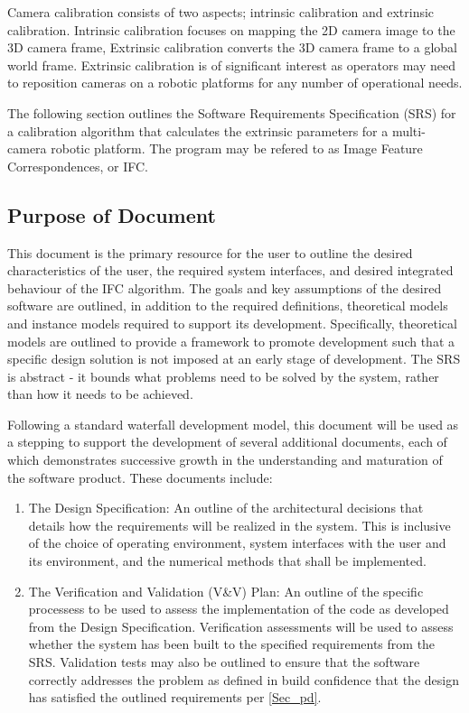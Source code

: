 \documentclass[12pt]{article}
\begin{document}
Camera calibration consists of two aspects; intrinsic calibration and extrinsic 
calibration. Intrinsic calibration focuses on mapping the 2D camera image 
to the 3D camera frame, Extrinsic calibration converts the 3D camera frame
to a global world frame. Extrinsic calibration is of significant interest as  
operators may need to reposition cameras on a robotic platforms for any number of 
operational needs.

The following section outlines the Software Requirements Specification (SRS) for 
a calibration algorithm that calculates the extrinsic parameters for a multi-camera 
robotic platform. The program may be refered to as Image Feature Correspondences, 
or IFC.



\subsection{Purpose of Document}

This document is the primary resource for the user to outline the desired 
characteristics of the user, the required system interfaces, and desired 
integrated behaviour of the IFC algorithm. The goals and key assumptions of the
desired software are outlined, in addition to the required definitions, 
theoretical models and instance models required to support its development. 
Specifically, theoretical models are outlined to provide a framework to promote 
development such that a specific design solution is not imposed at an early stage 
of development. The SRS is abstract - it bounds what problems need to be solved by 
the system, rather than how it needs to be achieved.

Following a standard waterfall development model, this document will be used as a 
stepping to support the development of several additional documents, each of which 
demonstrates successive growth in the understanding and maturation of the software 
product. These documents include:
\begin{enumerate}
  \item The Design Specification: An outline of the architectural decisions that 
  details   how the requirements will be realized in the system. This is inclusive 
  of the choice of operating environment, system interfaces with the user and its 
  environment, and the   numerical methods that shall be implemented.

  \item The Verification and Validation (V\&V) Plan: An outline of the specific processess 
  to be used to assess the implementation of the code as developed from the Design 
  Specification. Verification assessments will be used to assess whether the system has been 
  built to the specified requirements from the SRS. Validation tests may also be outlined to 
  ensure that the software correctly addresses the problem as defined in  build confidence 
  that the   design has satisfied the outlined requirements per \ref{Sec_pd}.
\end{enumerate}
\end{document}
